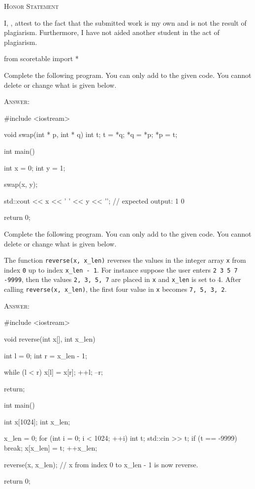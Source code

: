 



\begin{center}
  \textsc{Honor Statement}
\end{center}
I, ,
attest to the fact that the submitted work is my own and
is not the result of plagiarism.
Furthermore, I have not aided another student in the act of
plagiarism.

\begin{python}
from scoretable import *
\end{python}
        
\newpage
\nextq
Complete the following program. You can only add to the given code.
You cannot delete or change what is given below.

\textsc{Answer:}
\begin{answercode}
#include <iostream>

void swap(int * p, int * q)
{
    int t;
    t = *q;
    *q = *p;
    *p = t;
}


int main()
{
    int x = 0;
    int y = 1;

    swap(x, y);
    
    std::cout << x << ' ' << y << '\n'; // expected output: 1 0
    
    return 0;
}
\end{answercode}

\newpage
\nextq
Complete the following program.
You can only add to the given code. 
You cannot delete or change what is given below.

The function \verb!reverse(x, x_len)! reverses the values in the integer
array \verb!x!
from index \verb!0! up to index \verb!x_len - 1!.
For instance suppose the user enters \verb!2 3 5 7 -9999!, then
the values \verb!2, 3, 5, 7! are placed in \verb!x!
and \verb!x_len! is set to 4.
After calling \verb!reverse(x, x_len)!,
the first four value in \verb!x! becomes \verb!7, 5, 3, 2!.

\textsc{Answer:}
\begin{answercode}
#include <iostream>

void reverse(int x[], int x_len)
{
       int l = 0;
       int r = x_len - 1;
       
       while (l < r)
       {
         x[l] = x[r];
         ++l;
         --r;
       }

       return;
}


int main()
{
    int x[1024];
    int x_len;

    x_len = 0;
    for (int i = 0; i < 1024; ++i)
    {
        int t;
        std::cin >> t;
        if (t == -9999)
        {
            break;
        }
        x[x_len] = t;
        ++x_len;
    }

    reverse(x, x_len);
    // x from index 0 to x_len - 1 is now reverse.
    
    return 0;
}
\end{answercode}

